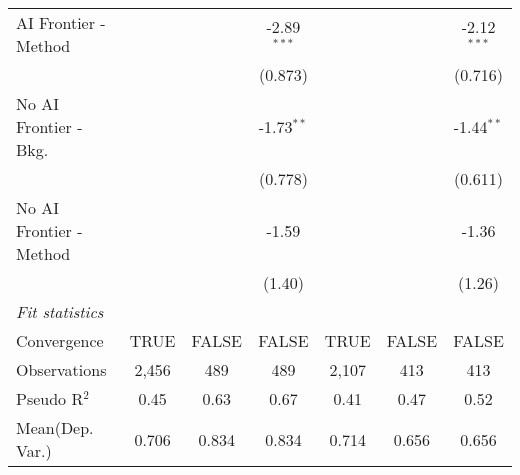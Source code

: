 \begin{tabular}{lcccccc}
   AI Frontier - Method    &              &            & -2.89$^{***}$ &              &            & -2.12$^{***}$\\   
                           &              &            & (0.873)       &              &            & (0.716)\\   
   No AI Frontier - Bkg.   &              &            & -1.73$^{**}$  &              &            & -1.44$^{**}$\\   
                           &              &            & (0.778)       &              &            & (0.611)\\   
   No AI Frontier - Method &              &            & -1.59         &              &            & -1.36\\   
                           &              &            & (1.40)        &              &            & (1.26)\\   
   \midrule
   \emph{Fit statistics}\\
   Convergence             &TRUE          & FALSE      & FALSE         & TRUE         & FALSE      & FALSE\\  
   Observations            & 2,456        & 489        & 489           & 2,107        & 413        & 413\\  
   Pseudo R$^2$            & 0.45         & 0.63       & 0.67          & 0.41         & 0.47       & 0.52\\  
Mean(Dep. Var.) & 0.706 & 0.834 & 0.834 & 0.714 & 0.656 & 0.656 \\
   

\end{tabular}
